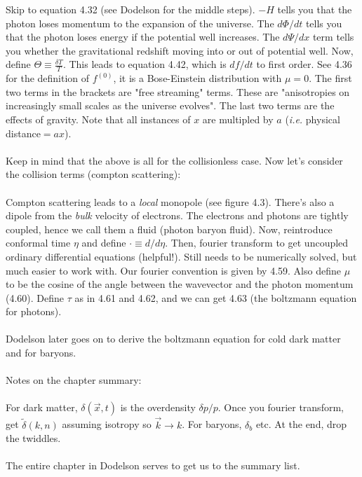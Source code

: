 \documentclass{article}
\begin{document}
Skip to equation 4.32 (see Dodelson for the middle steps).  $-H$ tells you that the photon loses momentum to the expansion of the universe.  The $d\Phi/dt$ tells you that the photon loses energy if the potential well increases.  The $d\Psi/dx$ term tells you whether the gravitational redshift moving into or out of potential well.  Now, define $\Theta\equiv \frac{\delta T}{T}$.  This leads to equation 4.42, which is $df/dt$ to first order.  See 4.36 for the definition of $f^{(0)}$, it is a Bose-Einstein distribution with $\mu=0$.  The first two terms in the brackets are "free streaming" terms.  These are "anisotropies on increasingly small scales as the universe evolves".  The last two terms are the effects of gravity.  Note that all instances of $x$ are multipled by $a$ (\emph{i.e.} physical distance$=ax$).
\\ \\
Keep in mind that the above is all for the collisionless case.  Now let's consider the collision terms (compton scattering):
\\ \\
Compton scattering leads to a \emph{local} monopole (see figure 4.3).  There's also a dipole from the \emph{bulk} velocity of electrons.  The electrons and photons are tightly coupled, hence we call them a fluid (photon baryon fluid).  Now, reintroduce conformal time $\eta$ and define $\cdot \equiv d/d\eta$.  Then, fourier transform to get uncoupled ordinary differential equations (helpful!).  Still needs to be numerically solved, but much easier to work with.  Our fourier convention is given by 4.59.  Also define $\mu$ to be the cosine of the angle between the wavevector and the photon momentum (4.60).  Define $\tau$ as in 4.61 and 4.62, and we can get 4.63 (the boltzmann equation for photons).
\\ \\
Dodelson later goes on to derive the boltzmann equation for cold dark matter and for baryons.
\\ \\
Notes on the chapter summary:
\\ \\
For dark matter, $\delta(\vec{x},t)$ is the overdensity $\delta p/p$.  Once you fourier transform, get $\widetilde{\delta}(k,n)$ assuming isotropy so $\vec{k}\rightarrow k$.  For baryons, $\delta_b$ etc.  At the end, drop the twiddles.
\\ \\
The entire chapter in Dodelson serves to get us to the summary list.
\end{document}
